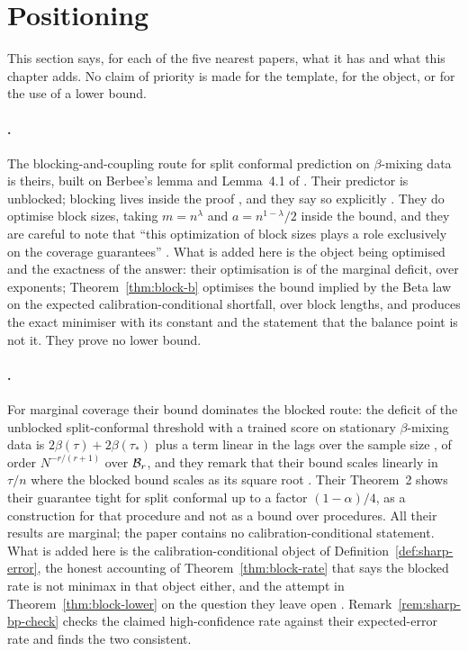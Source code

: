 \documentclass[../../../main.tex]{subfiles}
\begin{document}
\section{Positioning}\label{sec:sharp-positioning}

This section says, for each of the five nearest papers, what it has and what this chapter adds. No claim of priority is made for the template, for the object, or for the use of a lower bound.

\paragraph{\citet{oliveira2024}.} The blocking-and-coupling route for split conformal prediction on $\beta$-mixing data is theirs, built on Berbee's lemma and Lemma~4.1 of \citet{yu1994}. Their predictor is unblocked; blocking lives inside the proof \citep[Prop.~10, pp.~20--21]{oliveira2024}, and they say so explicitly \citep[p.~2]{oliveira2024}. They do optimise block sizes, taking $m=n^\lambda$ and $a=n^{1-\lambda}/2$ inside the bound, and they are careful to note that ``this optimization of block sizes plays a role exclusively on the coverage guarantees'' \citep[p.~8]{oliveira2024}. What is added here is the object being optimised and the exactness of the answer: their optimisation is of the marginal deficit, over exponents; Theorem~\ref{thm:block-b} optimises the bound implied by the Beta law on the expected calibration-conditional shortfall, over block lengths, and produces the exact minimiser with its constant and the statement that the balance point is not it. They prove no lower bound.

\paragraph{\citet{barber2026}.} For marginal coverage their bound dominates the blocked route: the deficit of the unblocked split-conformal threshold with a trained score on stationary $\beta$-mixing data is $2\beta(\tau)+2\beta(\tau_*)$ plus a term linear in the lags over the sample size \citep[Cor.~2]{barber2026}, of order $N^{-r/(r+1)}$ over $\mathcal B_{r}$, and they remark that their bound scales linearly in $\tau/n$ where the blocked bound scales as its square root \citep[Sec.~3.4]{barber2026}. Their Theorem~2 shows their guarantee tight for split conformal up to a factor $(1-\alpha)/4$, as a construction for that procedure and not as a bound over procedures. All their results are marginal; the paper contains no calibration-conditional statement. What is added here is the calibration-conditional object of Definition~\ref{def:sharp-error}, the honest accounting of Theorem~\ref{thm:block-rate} that says the blocked rate is not minimax in that object either, and the attempt in Theorem~\ref{thm:block-lower} on the question they leave open \citep[Sec.~4]{barber2026}. Remark~\ref{rem:sharp-bp-check} checks the claimed high-confidence rate against their expected-error rate and finds the two consistent.
\end{document}
